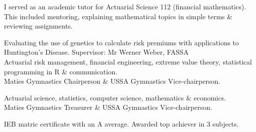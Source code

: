 \documentclass[10pt,a4paper,ragged2e,withhyper]{altacv}
\begin{document}
\begin{paracol}{2}
\begin{itemize}[label=$\circ$, leftmargin=0.9cm, labelsep=0.43cm]
  \end{itemize}
  \medskip 
  I served as an academic tutor for Actuarial Science 112 (financial mathematics).\\ This included mentoring, explaining mathematical topics in simple terms \& reviewing assignments. 

  \bigskip 
  
  \newpage

  \smallskip
  \smallskip
  Evaluating the use of genetics to calculate risk premiums with applications to Huntington's Disease. Supervisor: Mr Werner Weber, FASSA\\
  \smallskip
  Actuarial risk management, financial engineering, extreme value theory, statistical programming in R \& communication.\\
  \smallskip
  Maties Gymnastics Chairperson \& USSA Gymnastics Vice-chairperson. 

  \medskip
  \smallskip
  Actuarial science, statistics, computer science, mathematics \& economics.\\
  \smallskip
  Maties Gymnastics Treasurer \& USSA Gymnastics Vice-chairperson.


  \medskip
  IEB matric certificate with an A average. Awarded top achiever in 3 subjects.



\end{paracol}
\end{document}
